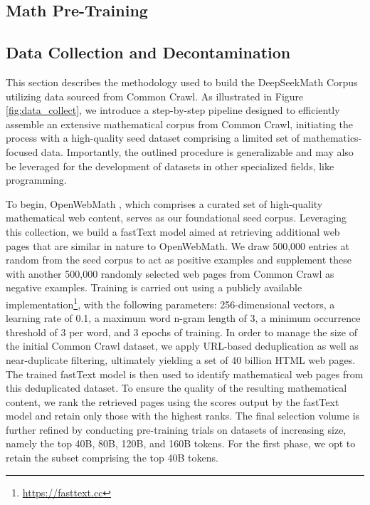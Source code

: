 \begin{itemize}[topsep=0pt]
\section{Math Pre-Training}

\subsection{Data Collection and Decontamination} This section describes the methodology used to build the DeepSeekMath Corpus utilizing data sourced from Common Crawl. As illustrated in Figure \ref{fig:data_collect}, we introduce a step-by-step pipeline designed to efficiently assemble an extensive mathematical corpus from Common Crawl, initiating the process with a high-quality seed dataset comprising a limited set of mathematics-focused data. Importantly, the outlined procedure is generalizable and may also be leveraged for the development of datasets in other specialized fields, like programming.

To begin, OpenWebMath \citep{openwebmath}, which comprises a curated set of high-quality mathematical web content, serves as our foundational seed corpus. Leveraging this collection, we build a fastText model \citep{joulin2016fasttext} aimed at retrieving additional web pages that are similar in nature to OpenWebMath. We draw 500,000 entries at random from the seed corpus to act as positive examples and supplement these with another 500,000 randomly selected web pages from Common Crawl as negative examples. Training is carried out using a publicly available implementation\footnote{\url{https://fasttext.cc}}, with the following parameters: 256-dimensional vectors, a learning rate of 0.1, a maximum word n-gram length of 3, a minimum occurrence threshold of 3 per word, and 3 epochs of training. In order to manage the size of the initial Common Crawl dataset, we apply URL-based deduplication as well as near-duplicate filtering, ultimately yielding a set of 40 billion HTML web pages. The trained fastText model is then used to identify mathematical web pages from this deduplicated dataset. To ensure the quality of the resulting mathematical content, we rank the retrieved pages using the scores output by the fastText model and retain only those with the highest ranks. The final selection volume is further refined by conducting pre-training trials on datasets of increasing size, namely the top 40B, 80B, 120B, and 160B tokens. For the first phase, we opt to retain the subset comprising the top 40B tokens.


\end{itemize}
